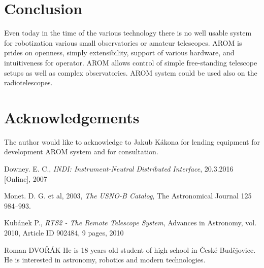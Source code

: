 \documentclass{poster16}
\begin{document}
\section{Conclusion}
Even today in the time of the various technology there is no well usable system for robotization various small observatories or amateur telescopes. AROM is prides on openness, simply extensibility, support of various hardware, and intuitiveness for operator. AROM allows control of simple free-standing telescope setups as well as complex observatories. AROM system could be used also on the radiotelescopes.

\section*{Acknowledgements}
The author would like to acknowledge to Jakub Kákona for lending equipment for development AROM system and for consultation.

\begin{thebibliography}{9}

 Downey. E. C., \emph{INDI: Instrument-Neutral Distributed Interface}, 20.3.2016 [Online], 2007

 Monet. D. G. et al, 2003, \emph{The USNO-B Catalog}, The Astronomical Journal 125 984–993.

\bibitem{} Kubánek P., \emph{RTS2 - The Remote Telescope System}, Advances in Astronomy, vol. 2010, Article ID 902484, 9 pages, 2010

\end{thebibliography}



\begin{authorcv}{Roman DVOŘÁK} He is 18 years old student of high school in České Budějovice. He is interested in astronomy, robotics and modern technologies. 

\end{authorcv}
\end{document}
